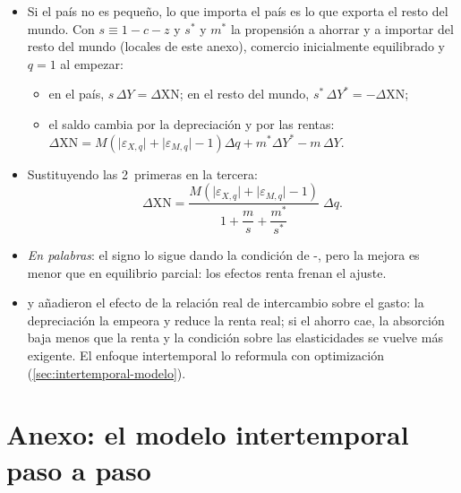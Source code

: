 \documentclass[11pt]{article}
\begin{document}
\begin{itemize}
\item Si el país no es pequeño, lo que importa el país es lo que exporta el resto del mundo. Con $s\equiv1-c-z$ y $s^*$ y $m^*$ la propensión a ahorrar y a importar del resto del mundo (locales de este anexo), comercio inicialmente equilibrado y $q=1$ al empezar:
  \begin{itemize}
  \item en el país, $s\,\Delta Y=\Delta\mathrm{XN}$; en el resto del mundo, $s^*\,\Delta Y^*=-\Delta\mathrm{XN}$;
  \item el saldo cambia por la depreciación y por las rentas: $\Delta\mathrm{XN}=M\left(\lvert\varepsilon_{X,q}\rvert+\lvert\varepsilon_{M,q}\rvert-1\right)\Delta q+m^*\Delta Y^*-m\,\Delta Y$.
  \end{itemize}
\item Sustituyendo las 2~primeras en la tercera:
  \[
  \Delta\mathrm{XN}=\frac{M\left(\lvert\varepsilon_{X,q}\rvert+\lvert\varepsilon_{M,q}\rvert-1\right)}{1+\dfrac{m}{s}+\dfrac{m^*}{s^*}}\;\Delta q .
  \]
  \findemo
\item \emph{En palabras}: el signo lo sigue dando la condición de -, pero la mejora es menor que en equilibrio parcial: los efectos renta frenan el ajuste.
\item \textcite{Harberger1950Currency} y \textcite{LaursenMetzler1950} añadieron el efecto de la relación real de intercambio sobre el gasto: la depreciación la empeora y reduce la renta real; si el ahorro cae, la absorción baja menos que la renta y la condición sobre las elasticidades se vuelve más exigente. El enfoque intertemporal lo reformula con optimización (\ref{sec:intertemporal-modelo}).
\end{itemize}

\section{Anexo: el modelo intertemporal paso a paso}\label{anexo:intertemporal}
\end{document}

